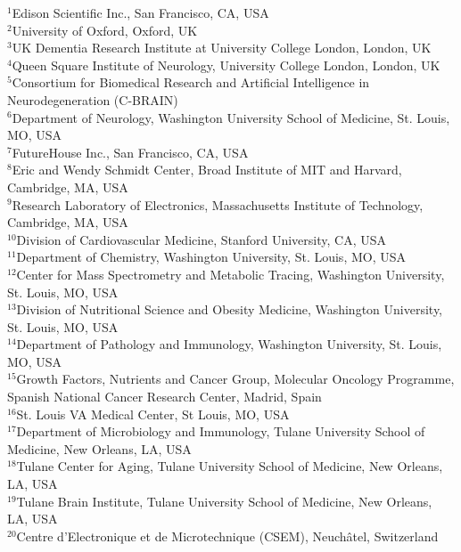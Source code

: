 \documentclass{article}
\newenvironment{headerbox}{
  \begin{tcolorbox}[
    colback=edisongray,      %
    colframe=edisongray,     %
    frame hidden,           %
    arc=4mm,                %
    boxrule=0pt,            %
    boxsep=0pt,             %
    left=15pt, right=15pt, top=10pt, bottom=15pt,
    nobeforeafter
  ]
}{
  \end{tcolorbox}
}
\begin{document}
\begin{center}
\begin{headerbox}
    {\footnotesize
    \raggedright
    $^{1}$Edison Scientific Inc., San Francisco, CA, USA \\
    $^{2}$University of Oxford, Oxford, UK \\
    $^{3}$UK Dementia Research Institute at University College London, London, UK \\
    $^{4}$Queen Square Institute of Neurology, University College London, London, UK \\
    $^{5}$Consortium for Biomedical Research and Artificial Intelligence in Neurodegeneration (C-BRAIN) \\
    $^{6}$Department of Neurology, Washington University School of Medicine, St. Louis, MO, USA \\
    $^{7}$FutureHouse Inc., San Francisco, CA, USA \\
    $^{8}$Eric and Wendy Schmidt Center, Broad Institute of MIT and Harvard, Cambridge, MA, USA \\
    $^{9}$Research Laboratory of Electronics, Massachusetts Institute of Technology, Cambridge, MA, USA \\
    $^{10}$Division of Cardiovascular Medicine, Stanford University, CA, USA \\
    $^{11}$Department of Chemistry, Washington University, St. Louis, MO, USA \\
    $^{12}$Center for Mass Spectrometry and Metabolic Tracing, Washington University, St. Louis, MO, USA \\
    $^{13}$Division of Nutritional Science and Obesity Medicine, Washington University, St. Louis, MO, USA \\
    $^{14}$Department of Pathology and Immunology, Washington University, St. Louis, MO, USA \\
    $^{15}$Growth Factors, Nutrients and Cancer Group, Molecular Oncology Programme, Spanish National Cancer Research Center, Madrid, Spain \\
    $^{16}$St. Louis VA Medical Center, St Louis, MO, USA \\
    $^{17}$Department of Microbiology and Immunology, Tulane University School of Medicine, New Orleans, LA, USA \\
    $^{18}$Tulane Center for Aging, Tulane University School of Medicine, New Orleans, LA, USA \\
    $^{19}$Tulane Brain Institute, Tulane University School of Medicine, New Orleans, LA, USA \\
    $^{20}$Centre d'Electronique et de Microtechnique (CSEM), Neuchâtel, Switzerland \\
}
\end{headerbox}
\end{center}
\end{document}

